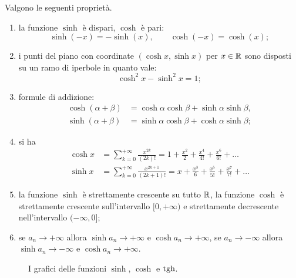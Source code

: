 \begin{theorem}
Valgono le seguenti proprietà.
\begin{enumerate}
\item
la funzione $\sinh$ è dispari, $\cosh$ è pari:
\[
\sinh(-x) = -\sinh(x),
\qquad
\cosh(-x) = \cosh(x);
\]

\item
i punti del piano con coordinate $(\cosh x, \sinh x)$
per $x\in \mathbb R$
sono disposti su un ramo di iperbole in quanto vale:
\[
  \cosh^2 x - \sinh^2 x = 1;
\]

\item formule di addizione:
\begin{align*}
  \cosh(\alpha+\beta) &= \cosh \alpha \cosh \beta + \sinh \alpha \sinh \beta,\\
  \sinh(\alpha+\beta) &= \sinh \alpha \cosh \beta + \cosh \alpha \sinh \beta;
\end{align*}

\item si ha
\begin{align*}
 \cosh x
 &= \sum_{k=0}^{+\infty} \frac{x^{2k}}{(2k)!}
 = 1 + \frac{x^2}{2} + \frac{x^4}{4!} + \frac{x^6}{6!} + \dots \\
 \sinh x
 &= \sum_{k=0}^{+\infty} \frac{x^{2k+1}}{(2k+1)!}
 = x + \frac{x^3}{6} + \frac{x^5}{5!} + \frac{x^7}{7!} + \dots
\end{align*}

\item
la funzione $\sinh$ è strettamente crescente su tutto $\mathbb R$,
la funzione $\cosh$
è strettamente crescente sull'intervallo
$[0,+\infty)$ e strettamente decrescente
nell'intervallo $(-\infty,0]$;

\item
se $a_n\to +\infty$ allora $\sinh a_n \to +\infty$ e $\cosh a_n \to +\infty$,
se $a_n\to -\infty$ allora $\sinh a_n \to -\infty$ e $\cosh a_n \to +\infty$.

\end{enumerate}
\end{theorem}
%
\begin{figure}
  \centering%
  \caption{I grafici delle funzioni $\sinh$, $\cosh$ e $\operatorname{tgh}$.}
\end{figure}

